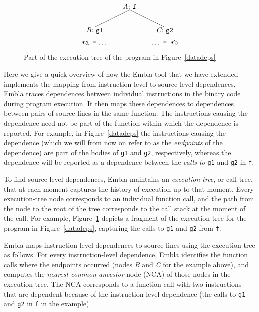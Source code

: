 \begin{figure} \small
\hrulefill
\[
\begin{picture}(160,60)(70,15)
\put(120,65){\makebox(60,10)[c]{\it A:\ \tt f}}
\put(150,65){\line(-2,-1){50}}
\put(150,65){\line( 2,-1){50}}
\put(170,30){\makebox(60,10)[c]{\it C:\ \tt g2}}
\put(70,30){\makebox(60,10)[c]{\it B:\ \tt g1}}
\put(70,15){\makebox(60,10)[cb]{{\tt *a\ =}\ \ldots}}
\put(170,15){\makebox(60,10)[cb]{\ldots\ {\tt =\ *b}}}
\end{picture}
\]
\hrulefill
\caption{Part of the execution tree of the program in Figure~\ref{datadeps}
} 
\label{ffextree}
\end{figure}

Here we give a quick overview of how the Embla tool that we have extended
implements the mapping from instruction level to source level dependences.
Embla traces dependences between individual instructions in the binary
code during program execution. It then maps these dependences to 
dependences between pairs of source lines in the same function. The
instructions causing the dependence need not be part of the function 
within which the dependence is reported. For example, in 
Figure~\ref{datadeps} the instructions causing the dependence (which we
will from now on refer to as the {\em endpoints} of the dependence) 
are part of the bodies of {\tt g1} and {\tt g2}, respectively, whereas the dependence 
will be reported as a dependence between the {\em calls to} {\tt g1} and 
{\tt g2} in {\tt f}.

To find source-level dependences, Embla maintains an {\em execution tree},
or call tree, that at each moment captures 
the history of execution up to that moment. Every execution-tree node 
corresponds to an
individual function call, and the path from the node to the root of the
tree corresponds to the call stack at the moment of the call. For
example, Figure~\ref{ffextree} depicts a fragment of the execution tree
for the program in Figure~\ref{datadeps}, capturing the calls to {\tt g1} 
and {\tt g2} from {\tt f}.

Embla maps instruction-level dependences to source lines
 using the execution tree as follows. For
every instruction-level dependence, Embla identifies the function calls
where the endpoints occurred (nodes {\it B} and {\it C} for the example
above), and computes the {\em nearest common ancestor} node (NCA) of
those nodes in the execution tree. The NCA corresponds to a function
call with two instructions that are dependent because of
the instruction-level dependence (the calls to {\tt g1} and {\tt g2} in 
{\tt f} in the example).

